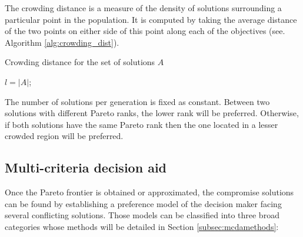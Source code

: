 \begin{definition}
The crowding distance is a measure of the density of solutions surrounding a particular point in the population. It is computed by taking the average distance of the two points on either side of this point along each of the objectives (see. Algorithm \ref{alg:crowding_dist}).
\end{definition}

\begin{algorithm}[h!]
\caption{Crowding distance for the set of solutions $A$}
\label{alg:crowding_dist}
$l = |A|$;\\
\end{algorithm}

The number of solutions per generation is fixed as constant. Between two solutions with different Pareto ranks, the lower rank will be preferred. Otherwise, if both solutions have the same Pareto rank then the one located in a lesser crowded region will be preferred.

\subsection{Multi-criteria decision aid}
\label{subsec:mcda}
Once the Pareto frontier is obtained or approximated, the compromise solutions can be found by establishing a preference model of the decision maker facing several conflicting solutions. Those models can be classified into three broad categories \cite{Vin92, beltstew} whose methods will be detailed in Section \ref{subsec:mcdamethods}:

